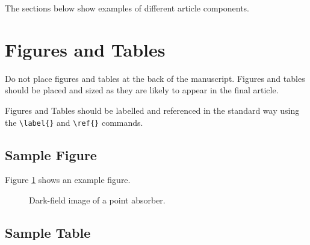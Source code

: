 \documentclass[9pt,twocolumn,twoside]{opticajnl}
\begin{document}
The sections below show examples of different article components.

\section{Figures and Tables}

Do not place figures and tables at the back of the manuscript. Figures and tables should be placed and sized as they are likely to appear in the final article. 

Figures and Tables should be labelled and referenced in the standard way using the \verb|\label{}| and \verb|\ref{}| commands.

\subsection{Sample Figure}

Figure \ref{fig:false-color} shows an example figure.

\begin{figure}[ht]
\centering
{}
\caption{Dark-field image of a point absorber.}
\label{fig:false-color}
\end{figure}

\subsection{Sample Table}
\end{document}
